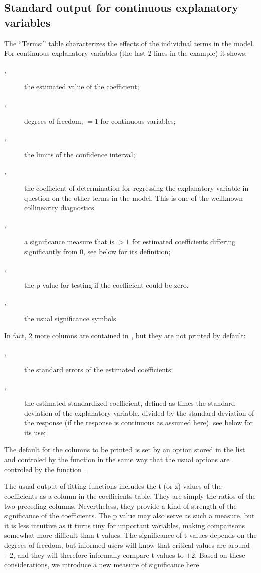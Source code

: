 \documentclass[11pt]{article}\usepackage[]{graphicx}\usepackage[]{color}
\begin{document}
\subsection{Standard output for continuous explanatory variables}
The ``Terms:'' table characterizes the effects of the individual terms in
the model. For continuous explanatory variables (the last 2 lines in the
example) it shows:
\begin{description}
\item[,] the estimated value of the coefficient;
\item[,] degrees of freedom, $=1$ for continuous variables;
\item[,] the limits of the confidence interval;
\item[,] the coefficient of determination for regressing 
  the explanatory variable in question on the other terms in the model.
  This is one of the wellknown collinearity diagnostics.
\item[,] a significance measure that is $>1$ for estimated
  coefficients differing significantly from 0, see below for its
  definition;
\item[,] the p value for testing if the coefficient could be
  zero. 
\item[,] the usual significance symbols.
\end{description}
In fact, 2 more columns are contained in , but they are
not printed by default:
\begin{description}
\item[,] the standard errors of the estimated coefficients; 
\item[,] the estimated standardized coefficient,
  defined as  times the standard deviation of the explanatory
  variable, divided by the standard deviation of the response (if
  the response is continuous as assumed here), see below for its use;
\end{description}
The default for the columns to be printed is set by an option stored 
in the  list and controled by the function 
 in the same way that the usual options are
controled by the function .

The usual  output of fitting functions includes the 
t (or z) values of the coefficients as a column in the coefficients 
table. 
They are simply the ratios of the two preceding columns. 
Nevertheless, they provide a kind of strength of the significance of the
coefficients. The p value may also serve as such a measure, but it is less 
intuitive as it turns tiny for important variables, making comparisons
somewhat more difficult than t values. 
The significance of t values depends on the degrees of freedom, but
informed users will know that critical values are around $\pm2$, and they will
therefore informally compare t values to $\pm2$. 
Based on these considerations, we introduce a new measure of significance
here. 
\end{document}
